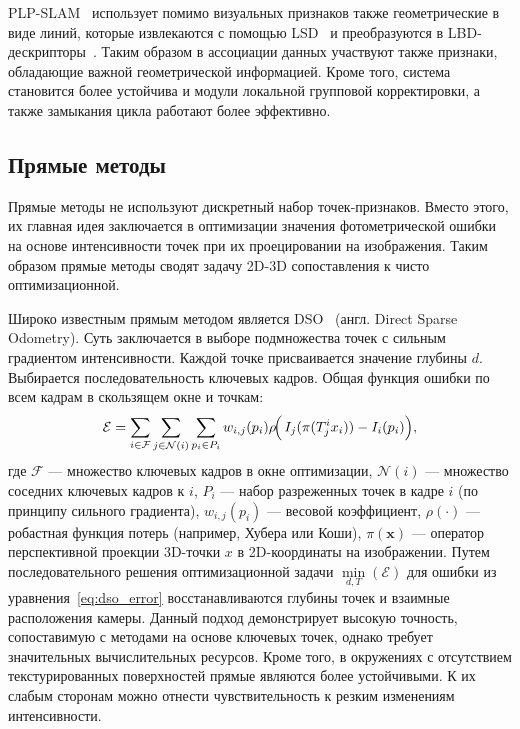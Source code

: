 PLP-SLAM~\cite{shu2023structure} использует помимо визуальных признаков также геометрические в виде линий,
которые извлекаются с помощью LSD~\cite{von2012lsd} и преобразуются в LBD-дескрипторы~\cite{zhang2013efficient}. Таким образом
в ассоциации данных участвуют также признаки, обладающие важной геометрической информацией.
Кроме того, система становится более устойчива и модули локальной групповой корректировки, а также
замыкания цикла работают более эффективно.


\subsection{Прямые методы}
Прямые методы не используют дискретный набор точек-признаков. Вместо этого, их главная
идея заключается в оптимизации значения фотометрической ошибки на основе интенсивности точек при их проецировании на изображения. 
Таким образом прямые методы сводят задачу 2D-3D сопоставления к чисто оптимизационной.


Широко известным прямым методом является DSO~\cite{engel2017direct} (англ. Direct Sparse Odometry). Суть заключается
в выборе подмножества точек с сильным градиентом интенсивности. Каждой точке 
присваивается значение глубины $d$. Выбирается последовательность ключевых кадров.
Общая функция ошибки по всем кадрам в скользящем окне и точкам:
\begin{equation}
    \label{eq:dso_error}
    \mathcal{E} = 
    \sum_{i \in \mathcal{F}} \sum_{j \in \mathcal{N}(i)} 
    \sum_{{p}_i \in P_i}
    w_{i,j}({p}_i) \rho\!\Bigl(\,
    I_j(\pi({T}_j^i {x}_i)) - I_i({p}_i)
    \Bigr),
\end{equation}
где  $\mathcal{F}$ --- множество ключевых кадров в окне оптимизации, $\mathcal{N}(i)$ ---
множество соседних ключевых кадров к $i$, $P_i$ --- набор разреженных 
точек в кадре $i$ (по принципу сильного градиента), $w_{i,j}({p}_i)$ --- 
весовой коэффициент, $\rho(\cdot)$ --- робастная функция потерь (например, 
Хубера или Коши), $\pi(\mathbf{x})$ --- оператор перспективной проекции 
3D-точки $x$ в 2D-координаты на изображении. Путем последовательного решения оптимизационной
задачи $\min\limits_{d, T}(\mathcal{E})$ для ошибки из уравнения~\eqref{eq:dso_error} восстанавливаются глубины точек и взаимные расположения 
камеры. Данный подход демонстрирует высокую точность, сопоставимую с
методами на основе ключевых точек, однако требует значительных вычислительных ресурсов.
Кроме того, в окружениях с отсутствием текстурированных поверхностей прямые являются
более устойчивыми. К их слабым сторонам можно отнести чувствительность к резким изменениям интенсивности.

